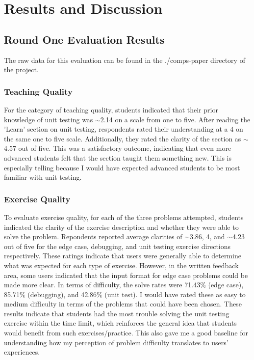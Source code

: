 \documentclass[10pt,twocolumn]{article}
\begin{document}
\section{Results and Discussion}

\subsection{Round One Evaluation Results}

The raw data for this evaluation can be found in the ./comps-paper directory of the project.

\subsubsection{Teaching Quality}

For the category of teaching quality, students indicated that their 
prior knowledge of unit testing was \(\sim \)2.14 on a scale from one to five. After reading the 'Learn' section on unit testing, 
respondents rated their understanding at a 4 on the same one to five scale. Additionally, they rated the clarity of the 
section as \(\sim \)4.57 out of five. This was a satisfactory outcome, indicating that even more advanced students felt 
that the section taught them something new. This is especially telling because I would have expected advanced students to
be most familiar with unit testing. 

\subsubsection{Exercise Quality}

To evaluate exercise quality, for each of the three problems attempted, students indicated the clarity of the exercise description and whether they 
were able to solve the problem. Repondents reported average clarities of \(\sim \)3.86, 4, and \(\sim \)4.23 out 
of five for the edge case, debugging, and unit testing exercise directions respectively. These ratings indicate that users 
were generally able to determine what was expected for each type of exercise. However, in the written feedback area, some 
users indicated that the input format for edge case problems could be made more clear. In terms of difficulty, the solve 
rates were 71.43\% (edge case), 85.71\% (debugging), and 42.86\% (unit test). I would have 
rated these as easy to medium difficulty in terms of the problems that could have been chosen. These results indicate that students had the most trouble solving the 
unit testing exercise within the time limit, which reinforces the general idea that students would benefit from such 
exercises/practice. This also gave me a good baseline for understanding how my perception of problem difficulty
translates to users' experiences.
\end{document}
